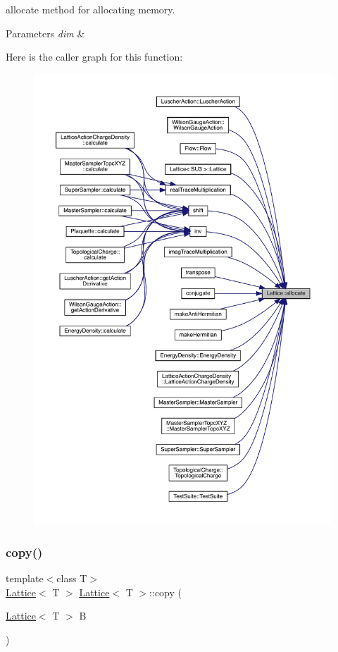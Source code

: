 allocate method for allocating memory. 


\begin{DoxyParams}{Parameters}
{\em dim} & \\
\hline
\end{DoxyParams}
Here is the caller graph for this function\+:
\nopagebreak
\begin{figure}[H]
\begin{center}
\leavevmode
\includegraphics[width=350pt]{class_lattice_a5b4e162f06f7b4b90b4a9335ed2aabb5_icgraph}
\end{center}
\end{figure}
\mbox{\label{class_lattice_a85154fbd1b0ae42af329135c6cd11f34}} 
\subsubsection{\texorpdfstring{copy()}{copy()}}
{\footnotesize\ttfamily template$<$class T$>$ \\
\mbox{\hyperlink{class_lattice}{Lattice}}$<$ T $>$ \mbox{\hyperlink{class_lattice}{Lattice}}$<$ T $>$\+::copy (\begin{DoxyParamCaption}\item[{\mbox{\hyperlink{class_lattice}{Lattice}}$<$ T $>$}]{B }\end{DoxyParamCaption})\hspace{0.3cm}{\ttfamily [inline]}}




